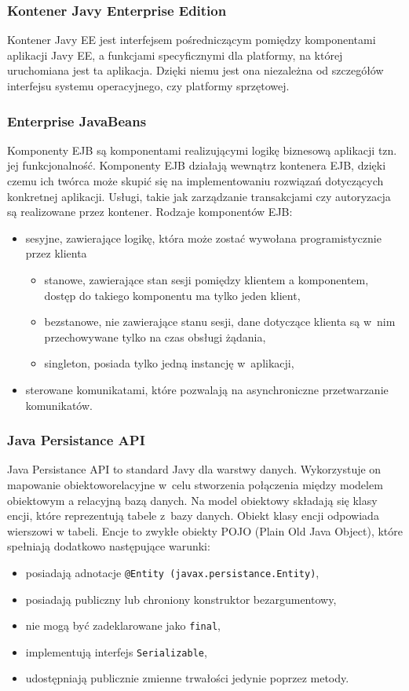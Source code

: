 \subsubsection{Kontener Javy Enterprise Edition}
Kontener Javy EE jest interfejsem pośredniczącym pomiędzy komponentami aplikacji
Javy EE, a funkcjami specyficznymi dla platformy, na której uruchomiana jest
ta aplikacja. Dzięki niemu jest ona niezależna od
szczegółów interfejsu systemu operacyjnego, czy platformy sprzętowej.
\subsubsection{Enterprise JavaBeans}
Komponenty EJB są komponentami realizującymi logikę biznesową aplikacji tzn. jej funkcjonalność. Komponenty EJB działają wewnątrz kontenera EJB, dzięki czemu ich twórca może skupić się na implementowaniu rozwiązań dotyczących konkretnej aplikacji. Usługi, takie jak zarządzanie transakcjami czy autoryzacja są realizowane przez kontener. Rodzaje komponentów EJB:
\begin{itemize}
	\item sesyjne, zawierające logikę, która może zostać wywołana programistycznie przez klienta
		\begin{itemize}
			\item stanowe, zawierające stan sesji pomiędzy klientem a komponentem, dostęp do takiego komponentu ma tylko jeden klient,
			\item bezstanowe, nie zawierające stanu sesji, dane dotyczące klienta są w~nim przechowywane tylko na czas obsługi żądania,
			\item singleton, posiada tylko jedną instancję w~aplikacji,
		\end{itemize}
	\item sterowane komunikatami, które pozwalają na asynchroniczne przetwarzanie komunikatów.
\end{itemize}
\subsubsection{Java Persistance API}
Java Persistance API to standard Javy dla warstwy danych. Wykorzystuje on
mapowanie obiektowo\dywiz relacyjne w~celu stworzenia połączenia między modelem
obiektowym a relacyjną bazą danych. Na model obiektowy składają się klasy encji,
które reprezentują tabele z~bazy danych. Obiekt klasy encji odpowiada wierszowi
w tabeli. Encje to zwykłe obiekty POJO (Plain Old Java Object), które spełniają dodatkowo następujące warunki:
\begin{itemize}
	\item posiadają adnotacje \lstinline|@Entity (javax.persistance.Entity)|,
	\item posiadają publiczny lub chroniony konstruktor bezargumentowy,
	\item nie mogą być zadeklarowane jako \lstinline|final|,
	\item implementują interfejs \lstinline|Serializable|,
	\item udostępniają publicznie zmienne trwałości jedynie poprzez metody.
\end{itemize}


